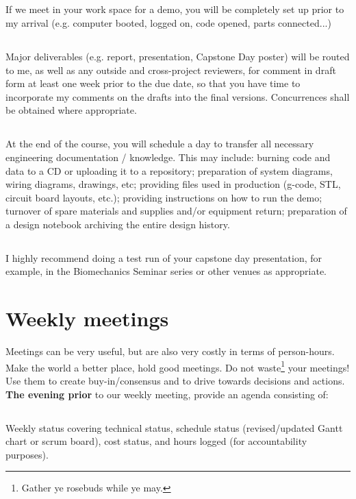 \documentclass[10pt,courier]{navymemo}
\begin{document}
\subsection{} If we meet in your work space for a demo, you will be completely set up prior to my arrival (e.g. computer booted, logged on, code opened, parts connected...)
\subsection{} Major deliverables (e.g. report, presentation, Capstone Day poster) will be routed to me, as well as any outside and cross-project reviewers, for comment in draft form at least one week prior to the due date, so that you have time to incorporate my comments on the drafts into the final versions.  Concurrences shall be obtained where appropriate. 
\subsection{} At the end of the course, you will schedule a day to transfer all necessary engineering documentation / knowledge.  This may include: burning code and data to a CD or uploading it to a repository; preparation of system diagrams, wiring diagrams, drawings, etc; providing files used in production (g-code, STL, circuit board layouts, etc.); providing instructions on how to run the demo; turnover of spare materials and supplies and/or equipment return; preparation of a design notebook archiving the entire design history.
\subsection{} I highly recommend doing a test run of your capstone day presentation, for example, in the Biomechanics Seminar series or other venues as appropriate.  

\section{Weekly meetings}  Meetings can be very useful, but are also very costly in terms of person-hours.  Make the world a better place, hold good meetings.  Do not waste\footnote{Gather ye rosebuds while ye may.}  your meetings! Use them to create buy-in/consensus and to drive towards decisions and actions.  \textbf{The evening prior} to our weekly meeting, provide an agenda consisting of:
\subsection{} Weekly status covering technical status, schedule status (revised/updated Gantt chart or scrum board), cost status, and hours logged (for accountability purposes). 
\end{document}

